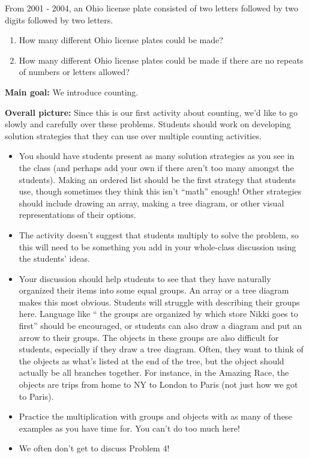 \documentclass[nooutcomes,noauthor, handout]{ximera}
\begin{document}
\begin{problem}
From 2001 - 2004, an Ohio license plate consisted of two letters followed by two digits followed by two letters.
\begin{enumerate}
\item How many different Ohio license plates could be made?
\item How many different Ohio license plates could be made if there are no repeats of numbers or letters allowed?
\end{enumerate}
\end{problem}

\newpage

\begin{instructorNotes}

{\bf Main goal:} We introduce counting. 

{\bf Overall picture:} Since this is our first activity about counting, we'd like to go slowly and carefully over these problems. Students should work on developing solution strategies that they can use over multiple counting activities.

\begin{itemize}
	\item You should have students present as many solution strategies as you see in the class (and perhaps add your own if there aren't too many amongst the students). Making an ordered list should be the first strategy that students use, though sometimes they think this isn't ``math'' enough! Other strategies should include drawing an array, making a tree diagram, or other visual representations of their options.
	\item The activity doesn't suggest that students multiply to solve the problem, so this will need to be something you add in your whole-class discussion using the students' ideas.
	\item Your discussion should help students to see that they have naturally organized their items into some equal groups. An array or a tree diagram makes this most obvious. Students will struggle with describing their groups here. Language like `` the groups are organized by which store Nikki goes to first'' should be encouraged, or students can also draw a diagram and put an arrow to their groups. The objects in these groups are also difficult for students, especially if they draw a tree diagram. Often, they want to think of the objects as what's listed at the end of the tree, but the object should actually be all branches together. For instance, in the Amazing Race, the objects are trips from home to NY to London to Paris (not just how we got to Paris).
	\item Practice the multiplication with groups and objects with as many of these examples as you have time for. You can't do too much here!
	\item We often don't get to discuss Problem 4!
\end{itemize}


\end{instructorNotes}
\end{document}
